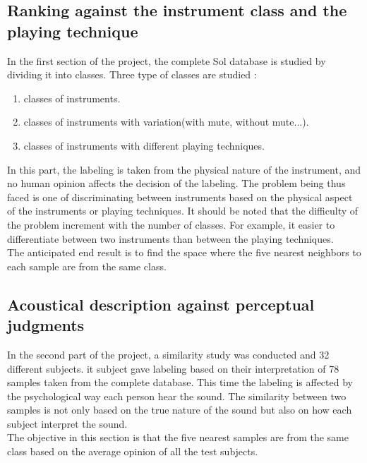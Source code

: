\documentclass[hidelinks,12pt]{report}
\begin{document}
\subsection{Ranking against the instrument class and the playing technique}
In the first section of the project, the complete Sol database is studied by dividing it into classes. Three type of classes are studied :
\begin{enumerate}
\item classes of instruments.
\item classes of instruments with variation(with mute, without mute...).
\item classes of instruments with different playing techniques.
\end{enumerate}
In this part, the labeling is taken from the physical nature of the instrument, and no human opinion affects the decision of the labeling. The problem being thus faced is one of discriminating between instruments based on the physical aspect of the instruments or playing techniques. It should be noted that the difficulty of the problem increment with the number of classes. For example, it easier to differentiate between two instruments than between the playing techniques.\\ The anticipated end result is to find the space where the five nearest neighbors to each sample are from the same class.

\subsection{Acoustical description against perceptual judgments}
In the second part of the project, a similarity study was conducted and 32 different subjects. it subject gave labeling based on their interpretation of 78 samples taken from the complete database. This time the labeling is affected by the psychological way each person hear the sound. The similarity between two samples is not only based on the true nature of the sound but also on how each subject interpret the sound.\\ The objective in this section is that the five nearest samples are from the same class based on the average opinion of all the test subjects.
\end{document}
